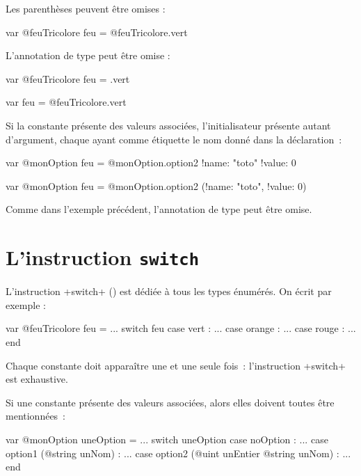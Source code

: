 Les parenthèses peuvent être omises :
\begin{galgas34}
var @feuTricolore feu = @feuTricolore.vert
\end{galgas34}

L'annotation de type peut être omise :

\begin{galgas34}
var @feuTricolore feu = .vert
\end{galgas34}

\begin{galgas34}
var feu = @feuTricolore.vert
\end{galgas34}


Si la constante présente des valeurs associées, l'initialisateur présente autant d'argument, chaque ayant comme étiquette le nom donné dans la déclaration~:

\begin{galgas3}
var @monOption feu = @monOption.option2 {!name: "toto" !value: 0}
\end{galgas3}

\begin{galgas34}
var @monOption feu = @monOption.option2 (!name: "toto", !value: 0)
\end{galgas34}

Comme dans l'exemple précédent, l'annotation de type peut être omise.








\section{L'instruction \texttt{switch}}

L'instruction \ggst+switch+ () est dédiée à tous les types énumérés. On écrit par exemple :

\begin{galgas34}
var @feuTricolore feu = ...
switch feu
case vert : ...
case orange : ...
case rouge : ...
end
\end{galgas34}

Chaque constante doit apparaître une et une seule fois~: l'instruction \ggst+switch+ est exhaustive.

Si une constante présente des valeurs associées, alors elles doivent toutes être mentionnées~:

\begin{galgas3}
var @monOption uneOption = ...
switch uneOption
case noOption : ...
case option1 (@string unNom) : ...
case option2 (@uint unEntier @string unNom) : ...
end
\end{galgas3}

